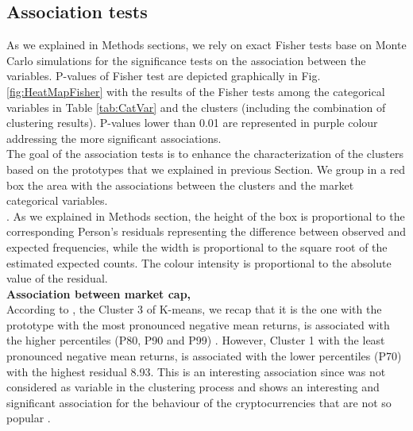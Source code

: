 \documentclass{bmcart}
\begin{document}
\subsection*{Association tests}

As we explained in Methods sections, we rely on exact Fisher tests base on Monte Carlo simulations for the significance tests on the association between the variables. P-values of Fisher test are depicted graphically in Fig. \ref{fig:HeatMapFisher} with  the results of the Fisher  tests among the categorical variables in Table \ref{tab:CatVar} and the clusters (including the combination of clustering results). P-values lower than 0.01 are represented in purple colour addressing the more significant associations. \\

The goal of the association tests is to enhance the characterization of the clusters based on the prototypes that we explained in previous Section. We group in a red box the area with the associations between the clusters and the market categorical variables. \\

. As we explained in Methods section, the height of the box is proportional to the corresponding Person's residuals representing the difference between observed and expected frequencies, while the width is proportional to the square root of the estimated expected counts. The colour intensity is proportional to the absolute value of the residual. \\

\textbf{Association between market cap, }\\

According to  , the Cluster 3 of K-means, we recap that it is the one with the prototype with the most pronounced negative mean returns, is associated with the higher    percentiles (P80, P90 and P99) . However, Cluster 1 with the least pronounced negative mean returns, is associated with the lower percentiles (P70) with the highest residual 8.93. This is an interesting association since   was not considered as variable in the clustering process and shows an interesting and significant association for the behaviour of the cryptocurrencies that are not so popular  .\\
\end{document}
